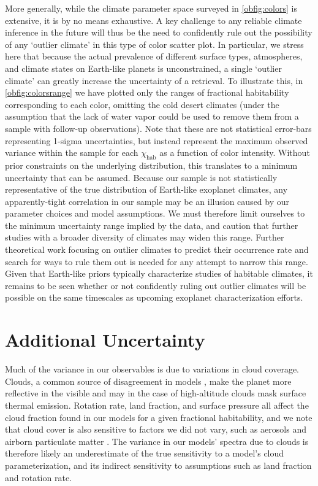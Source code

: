 \documentclass[fleqn,usenatbib]{mnras}
\begin{document}
More generally, while the climate parameter space surveyed in \autoref{obfig:colors} is extensive, it is by no means exhaustive. A key challenge to any reliable climate inference in the future will thus be the need to confidently rule out the possibility of any `outlier climate' in this type of color scatter plot. In particular, we stress here that because the actual prevalence of different surface types, atmospheres, and climate states on Earth-like planets is unconstrained, a single `outlier climate' can greatly increase the uncertainty of a retrieval. To illustrate this, in \autoref{obfig:colorsrange} we have plotted only the ranges of fractional habitability corresponding to each color, omitting the cold desert climates (under the assumption that the lack of water vapor could be used to remove them from a sample with follow-up observations). Note that these are not statistical error-bars representing 1-sigma uncertainties, but instead represent the maximum observed variance within the sample for each $\chi_\text{hab}$ as a function of color intensity. Without prior constraints on the underlying distribution, this translates to a minimum uncertainty that can be assumed. Because our sample is not statistically representative of the true distribution of Earth-like exoplanet climates, any apparently-tight correlation in our sample may be an illusion caused by our parameter choices and model assumptions. We must therefore limit ourselves to the minimum uncertainty range implied by the data, and caution that further studies with a broader diversity of climates may widen this range. Further theoretical work focusing on outlier climates to predict their occurrence rate and search for ways to rule them out is needed for any attempt to narrow this range. Given that Earth-like priors typically characterize studies of habitable climates, it remains to be seen whether or not confidently ruling out outlier climates will be possible on the same timescales as upcoming exoplanet characterization efforts.


\section{Additional Uncertainty}


Much of the variance in our observables is due to variations in cloud coverage. Clouds, a common source of disagreement in models \citep{cam5clouds,Yang2019,Fauchez2020}, make the planet more reflective in the visible and may in the case of high-altitude clouds mask surface thermal emission. Rotation rate, land fraction, and surface pressure all affect the cloud fraction found in our models for a given fractional habitability, and we note that cloud cover is also sensitive to factors we did not vary, such as aerosols and airborn particulate matter \citep{Cloudreview,cam5clouds,cmip2019}. The variance in our models' spectra due to clouds is therefore likely an underestimate of the true sensitivity to a model's cloud parameterization, and its indirect sensitivity to assumptions such as land fraction and rotation rate.
\end{document}
